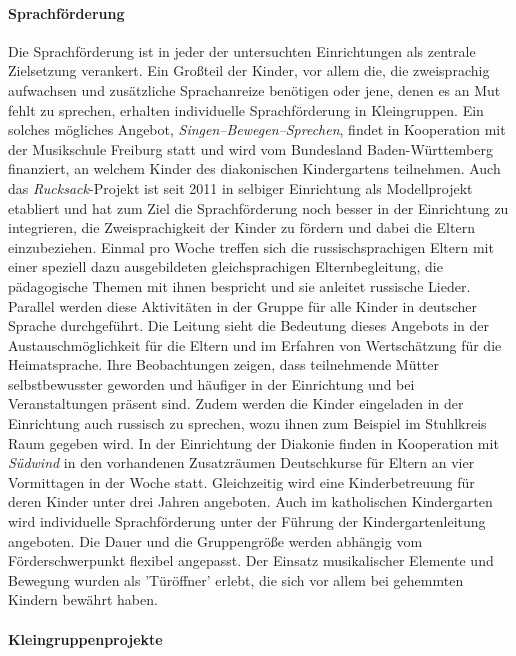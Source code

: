 \paragraph{Sprachförderung}
Die Sprachförderung ist in jeder der untersuchten Einrichtungen als zentrale Zielsetzung verankert. 
Ein Großteil der Kinder, vor allem die, die zweisprachig aufwachsen und zusätzliche Sprachanreize benötigen oder jene, denen es an Mut fehlt zu sprechen, erhalten individuelle Sprachförderung in Kleingruppen. Ein solches mögliches Angebot, \emph{Singen--Bewegen--Sprechen}, findet in Kooperation mit der Musikschule Freiburg statt und wird vom  Bundesland Baden-Württemberg finanziert, an welchem Kinder des diakonischen Kindergartens teilnehmen. Auch das \emph{Rucksack}-Projekt ist seit 2011 in selbiger Einrichtung als Modellprojekt etabliert und hat zum Ziel die Sprachförderung noch besser in der Einrichtung zu integrieren, die Zweisprachigkeit der Kinder zu fördern und dabei die Eltern einzubeziehen. Einmal pro Woche treffen sich die russischsprachigen Eltern mit einer speziell dazu ausgebildeten gleichsprachigen Elternbegleitung, die pädagogische Themen mit ihnen bespricht und sie anleitet russische Lieder. Parallel werden diese Aktivitäten in der Gruppe für alle Kinder in deutscher Sprache durchgeführt. Die Leitung sieht die Bedeutung dieses Angebots in der Austauschmöglichkeit für die Eltern und im Erfahren von Wertschätzung für die Heimatsprache. Ihre Beobachtungen zeigen, dass teilnehmende Mütter selbstbewusster geworden und häufiger in der Einrichtung und bei Veranstaltungen präsent sind. Zudem werden die Kinder eingeladen in der Einrichtung auch russisch zu sprechen, wozu ihnen zum Beispiel im Stuhlkreis Raum gegeben wird.     
In der Einrichtung der Diakonie finden in Kooperation mit \emph{Südwind} in den vorhandenen Zusatzräumen Deutschkurse für Eltern an vier Vormittagen in der Woche statt. Gleichzeitig wird eine Kinderbetreuung für deren Kinder unter drei Jahren angeboten.   
Auch im katholischen Kindergarten wird individuelle Sprachförderung unter der Führung der Kindergartenleitung angeboten. Die Dauer und die Gruppengröße werden abhängig vom Förderschwerpunkt flexibel angepasst. Der Einsatz musikalischer Elemente und Bewegung wurden als 'Türöffner' erlebt, die sich vor allem bei gehemmten Kindern bewährt haben.

\paragraph{Kleingruppenprojekte}

